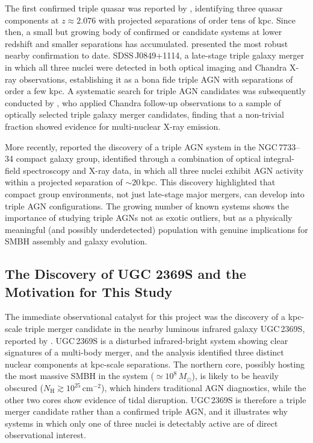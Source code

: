 \documentclass[twocolumn, 10pt]{article}
\begin{document}
The first confirmed triple quasar was reported by \citet{Djorgovski2007}, identifying three quasar components at $z \approx 2.076$ with projected separations of order tens of kpc. Since then, a small but growing body of confirmed or candidate systems at lower redshift and smaller separations has accumulated. \citet{Pfeifle2019} presented the most robust nearby confirmation to date. SDSS\,J0849+1114, a late-stage triple galaxy merger in which all three nuclei were detected in both optical imaging and Chandra X-ray observations, establishing it as a bona fide triple AGN with separations of order a few kpc. A systematic search for triple AGN candidates was subsequently conducted by \citet{Foord2020}, who applied Chandra follow-up observations to a sample of optically selected triple galaxy merger candidates, finding that a non-trivial fraction showed evidence for multi-nuclear X-ray emission.
 
More recently, \citet{Keshri2025} reported the discovery of a triple AGN system in the NGC\,7733--34 compact galaxy group, identified through a combination of optical integral-field spectroscopy and X-ray data, in which all three nuclei exhibit AGN activity within a projected separation of $\sim 20$\,kpc. This discovery highlighted that compact group environments, not just late-stage major mergers, can develop into triple AGN configurations. The growing number of known systems shows the importance of studying triple AGNs not as exotic outliers, but as a physically meaningful (and possibly underdetected) population with genuine implications for SMBH assembly and galaxy evolution.
 
\subsection{The Discovery of UGC 2369S and the Motivation for This Study}
\label{subsec:koss}
 
The immediate observational catalyst for this project was the discovery of a kpc-scale triple merger candidate in the nearby luminous infrared galaxy UGC\,2369S, reported by \citet{Ding2025}. UGC\,2369S is a disturbed infrared-bright system showing clear signatures of a multi-body merger, and the \citeauthor{Ding2025} analysis identified three distinct nuclear components at kpc-scale separations. The northern core, possibly hosting the most massive SMBH in the system ($\simeq 10^8\,M_\odot$), is likely to be heavily obscured ($N_\mathrm{H} \gtrsim 10^{25}\,\mathrm{cm^{-2}}$), which hinders traditional AGN diagnostics, while the other two cores show evidence of tidal disruption. UGC\,2369S is therefore a triple merger candidate rather than a confirmed triple AGN, and it illustrates why systems in which only one of three nuclei is detectably active are of direct observational interest.
 
\end{document}
